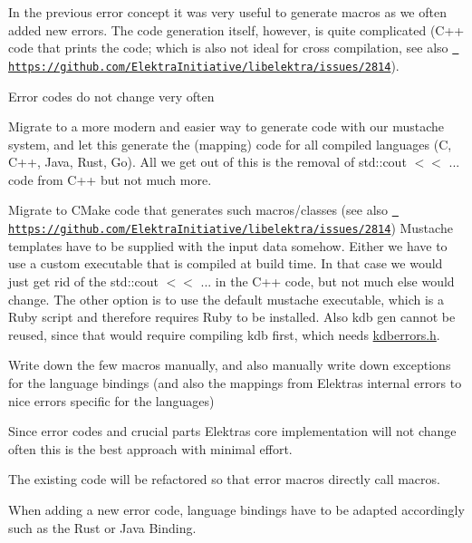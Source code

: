 In the previous error concept it was very useful to generate macros as we often added new errors. The code generation itself, however, is quite complicated (C++ code that prints the code; which is also not ideal for cross compilation, see also \href{https://github.com/ElektraInitiative/libelektra/issues/2814}{\texttt{ https\+://github.\+com/\+Elektra\+Initiative/libelektra/issues/2814}}).


\begin{DoxyItemize}
\item Error codes do not change very often
\end{DoxyItemize}


\begin{DoxyItemize}
\item Migrate to a more modern and easier way to generate code with our mustache system, and let this generate the (mapping) code for all compiled languages (C, C++, Java, Rust, Go). All we get out of this is the removal of {\ttfamily std\+::cout $<$$<$ ...} code from C++ but not much more.
\item Migrate to C\+Make code that generates such macros/classes (see also \href{https://github.com/ElektraInitiative/libelektra/issues/2814}{\texttt{ https\+://github.\+com/\+Elektra\+Initiative/libelektra/issues/2814}}) Mustache templates have to be supplied with the input data somehow. Either we have to use a custom executable that is compiled at build time. In that case we would just get rid of the std\+::cout $<$$<$ ... in the C++ code, but not much else would change. The other option is to use the default mustache executable, which is a Ruby script and therefore requires Ruby to be installed. Also kdb gen cannot be reused, since that would require compiling kdb first, which needs \mbox{\hyperlink{kdberrors_8h}{kdberrors.\+h}}.
\end{DoxyItemize}

Write down the few macros manually, and also manually write down exceptions for the language bindings (and also the mappings from Elektra\textquotesingle{}s internal errors to nice errors specific for the languages)

Since error codes and crucial parts Elektra\textquotesingle{}s core implementation will not change often this is the best approach with minimal effort.

The existing code will be refactored so that error macros directly call macros.

When adding a new error code, language bindings have to be adapted accordingly such as the Rust or Java Binding.


